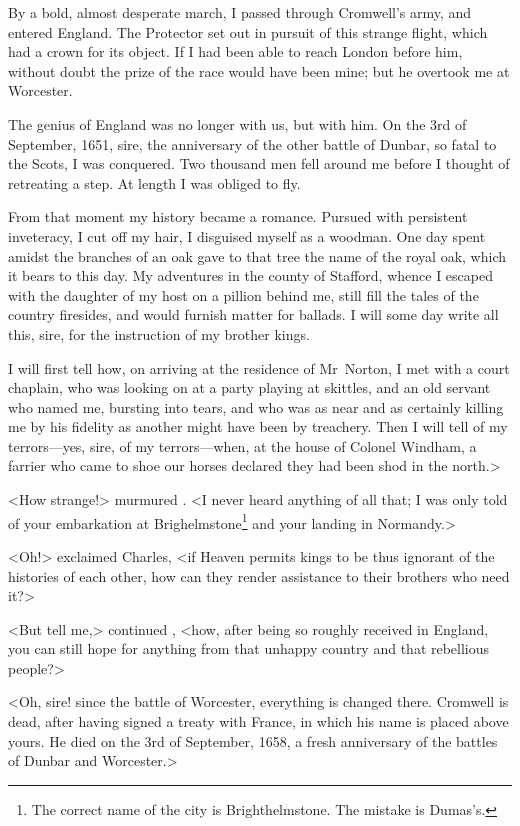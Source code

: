 By a bold, almost desperate march, I passed through Cromwell's army, and entered England. The Protector set out in pursuit of this strange flight, which had a crown for its object. If I had been able to reach London before him, without doubt the prize of the race would have been mine; but he overtook me at Worcester.

The genius of England was no longer with us, but with him. On the 3rd of September, 1651, sire, the anniversary of the other battle of Dunbar, so fatal to the Scots, I was conquered. Two thousand men fell around me before I thought of retreating a step. At length I was obliged to fly.

From that moment my history became a romance. Pursued with persistent inveteracy, I cut off my hair, I disguised myself as a woodman. One day spent amidst the branches of an oak gave to that tree the name of the royal oak, which it bears to this day. My adventures in the county of Stafford, whence I escaped with the daughter of my host on a pillion behind me, still fill the tales of the country firesides, and would furnish matter for ballads. I will some day write all this, sire, for the instruction of my brother kings.

I will first tell how, on arriving at the residence of Mr~Norton, I met with a court chaplain, who was looking on at a party playing at skittles, and an old servant who named me, bursting into tears, and who was as near and as certainly killing me by his fidelity as another might have been by treachery. Then I will tell of my terrors—yes, sire, of my terrors—when, at the house of Colonel Windham, a farrier who came to shoe our horses declared they had been shod in the north.>

<How strange!> murmured . <I never heard anything of all that; I was only told of your embarkation at Brighelmstone\footnote{The correct name of the city is Brighthelmstone. The mistake is Dumas's.} and your landing in Normandy.>

<Oh!> exclaimed Charles, <if Heaven permits kings to be thus ignorant of the histories of each other, how can they render assistance to their brothers who need it?>

<But tell me,> continued , <how, after being so roughly received in England, you can still hope for anything from that unhappy country and that rebellious people?>

<Oh, sire! since the battle of Worcester, everything is changed there. Cromwell is dead, after having signed a treaty with France, in which his name is placed above yours. He died on the 3rd of September, 1658, a fresh anniversary of the battles of Dunbar and Worcester.>

